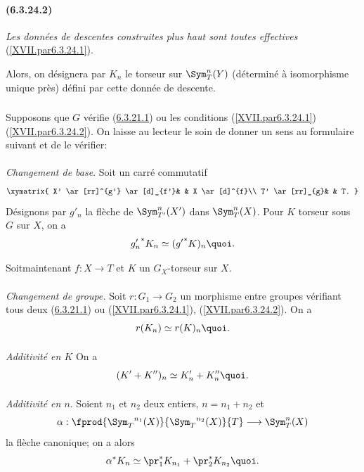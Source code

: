 \documentclass[10pt]{../fichiers-configuration-latex/smfart}
\begin{document}
\paragraph*{(6.3.24.2)}\label{XVII.par6.3.24.2}
\emph{Les données de descentes construites plus haut sont toutes
effectives} (\cf \ref{XVII.par6.3.24.1}).

Alors, on désignera par $K_{n}$ le torseur sur $\Sym^{n}_{T}(Y)$
(déterminé à isomorphisme unique près) défini par cette donnée de
descente.

\subsubsection{}
Supposons que $G$ vérifie (\hyperref[XVII.par6.3.21.1]{6.3.21.1}) ou les conditions
(\ref{XVII.par6.3.24.1}) (\ref{XVII.par6.3.24.2}). On laisse au
lecteur le soin de donner un sens au formulaire suivant et de le vérifier:

\paragraph{}
\emph{Changement de base}. Soit un carré commutatif
\[
\xymatrix{
X' \ar[rr]^{g'} \ar[d]_{f'}& & X \ar[d]^{f}\\
T' \ar[rr]_{g}& & T.
}
\]
Désignons par $g'_{n}$ la flèche de $\Sym^{n}_{T'}(X')$ dans
$\Sym^{n}_{T}(X)$. Pour $K$ torseur sous $G$ sur $X$, on a
\[
{g'_n}^{\ast} K_{n}\simeq ({g'}^{\ast}K)_{n}{\quoi}.
\]

Soit\pageoriginale maintenant $f:X\rightarrow T$ et $K$ un
$G_{X}$-torseur sur $X$.

\paragraph{}
\emph{Changement de groupe.} Soit $r:G_{1}\rightarrow G_{2}$ un
morphisme entre groupes vérifiant tous deux (\hyperref[XVII.par6.3.21.1]{6.3.21.1})
ou (\ref{XVII.par6.3.24.1}), (\ref{XVII.par6.3.24.2}). On a
\[
r(K_{n})\simeq r(K)_{n}{\quoi}.
\]

\paragraph{}
\emph{Additivité en $K$} On a
\[
(K'+K'')_{n}\simeq K'_{n}+K''_{n}{\quoi}.
\]

\paragraph{}
\emph{Additivité en $n$}. Soient $n_{1}$ et $n_{2}$ deux entiers,
$n=n_{1}+n_{2}$ et
\[
\alpha:\fprod{\Sym_{T}{}^{n_{1}}(X)}{\Sym_{T}{}^{n_{2}}(X)}{T}\longrightarrow
\Sym^{n}_{T}(X)
\]
la flèche canonique; on a alors
\[
\alpha^{\ast}K_{n}\simeq \pr^{\ast}_{1}
K_{n_{1}}+\pr^{\ast}_{2}K_{n_{2}}{\quoi}.
\]
\end{document}
